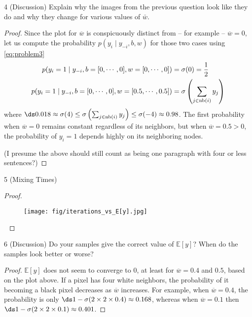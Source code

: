 \documentclass[12pt]{article}
\begin{document}
\begin{problem}{4 (Discussion)}
Explain why the images from the previous question look like they do and why they change for various values of $\bar{w}$.
\end{problem}

\begin{proof}
Since the plot for $\overline{w}$ is conspicuously distinct from -- for example -- $\overline{w} = 0$, let us compute the probability $p(y_i \mid y_{-i}, b, w)$ for those two cases using \cref{eq:problem3}
\begin{align*}
    p(y_i =1 \mid y_{-i}, b = [0,\cdots, 0], w = [0, \cdots, 0])
    & = \sigma(0) = \frac{1}{2} \\
    p(y_i =1 \mid y_{-i}, b = [0,\cdots, 0], w = [0.5, \cdots, 0.5])
    & = \sigma\left( \sum_{j \in \mathrm{nb}(i)} y_j \right)
\end{align*}
where $\ds 0.018 \approx \sigma(4) \leq \sigma\left( \sum_{j \in \nb{i}} y_j \right) \leq \sigma(-4) \approx 0.98$. The first probability when $\overline{w} = 0$ remains constant regardless of its neighbors, but when $\overline{w} = 0.5 > 0$, the probability of $y_i = 1$ depends highly on its neighboring nodes. 

(I presume the above should still count as being one paragraph with four or less sentences?)
\end{proof}

\newpage

\begin{problem}{5 (Mixing Times)}

\end{problem}

\begin{proof} $\;$

\begin{figure}[!ht]
    \centering
    \texttt{[image: fig/iterations\_vs\_E[y].jpg]}
\end{figure}

$\;$
\end{proof}

\begin{problem}{6 (Discussion)}
Do your samples give the correct value of $\mathbb{E}[y]$? When do the samples look better or worse?
\end{problem}

\begin{proof}
$\mathbb{E}[y]$ does not seem to converge to $0$, at least for $\overline{w}=0.4$ and $0.5$, based on the plot above. If a pixel has four white neighbors, the probability of it becoming a black pixel decreases as $\overline{w}$ increases. For example, when $\overline{w} = 0.4$, the probability is only $\ds 1-\sigma(2 \times 2 \times 0.4) \approx 0.168$, whereas when $\overline{w} = 0.1$ then $\ds 1-\sigma(2 \times 2 \times 0.1) \approx 0.401$.
\end{proof}
\end{document}
